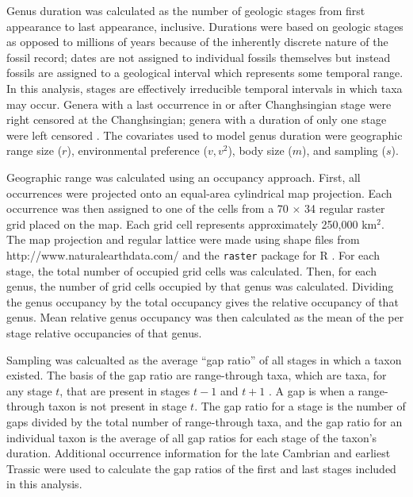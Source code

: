 \documentclass{article}
\begin{document}
Genus duration was calculated as the number of geologic stages from first appearance to last appearance, inclusive. Durations were based on geologic stages as opposed to millions of years because of the inherently discrete nature of the fossil record; dates are not assigned to individual fossils themselves but instead fossils are assigned to a geological interval which represents some temporal range. In this analysis, stages are effectively irreducible temporal intervals in which taxa may occur. Genera with a last occurrence in or after Changhsingian stage were right censored at the Changhsingian; genera with a duration of only one stage were left censored \citep{Klein2003}. The covariates used to model genus duration were geographic range size (\(r\)), environmental preference (\(v, v^{2}\)), body size (\(m\)), and sampling (\(s\)).

Geographic range was calculated using an occupancy approach. First, all occurrences were projected onto an equal-area cylindrical map projection. Each occurrence was then assigned to one of the cells from a 70 \(\times\) 34 regular raster grid placed on the map. Each grid cell represents approximately 250,000 km\(^{2}\). The map projection and regular lattice were made using shape files from http://www.naturalearthdata.com/ and the \texttt{raster} package for R \citep{raster}. For each stage, the total number of occupied grid cells was calculated. Then, for each genus, the number of grid cells occupied by that genus was calculated. Dividing the genus occupancy by the total occupancy gives the relative occupancy of that genus. Mean relative genus occupancy was then calculated as the mean of the per stage relative occupancies of that genus. 

Sampling was calcualted as the average ``gap ratio'' of all stages in which a taxon existed. The basis of the gap ratio are range-through taxa, which are taxa, for any stage \(t\), that are present in stages \(t-1\) and \(t+1\) \citep{Foote1996e,Foote2000,Alroy2010c}. A gap is when a range-through taxon is not present in stage \(t\). The gap ratio for a stage is the number of gaps divided by the total number of range-through taxa, and the gap ratio for an individual taxon is the average of all gap ratios for each stage of the taxon's duration. Additional occurrence information for the late Cambrian and earliest Trassic were used to calculate the gap ratios of the first and last stages included in this analysis. 
\end{document}
